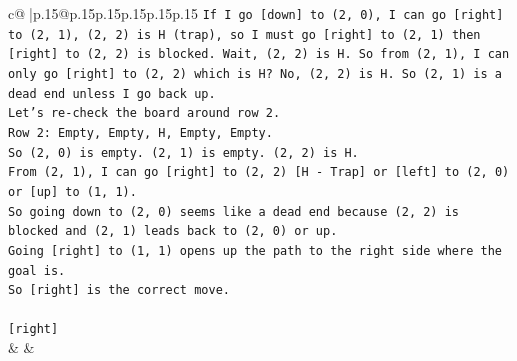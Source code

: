 \documentclass{article}
\begin{document}
{\begin{supertabular}{c@{$\;$}|p{.15\linewidth}@{}p{.15\linewidth}p{.15\linewidth}p{.15\linewidth}p{.15\linewidth}p{.15\linewidth}}
{{{\texttt{If I go {[}down{]} to (2, 0), I can go {[}right{]} to (2, 1), (2, 2) is H (trap), so I must go {[}right{]} to (2, 1) then {[}right{]} to (2, 2) is blocked. Wait, (2, 2) is H. So from (2, 1), I can only go {[}right{]} to (2, 2) which is H? No, (2, 2) is H. So (2, 1) is a dead end unless I go back up.} \\
\texttt{Let's re{-}check the board around row 2.} \\
\texttt{Row 2: Empty, Empty, H, Empty, Empty.} \\
\texttt{So (2, 0) is empty. (2, 1) is empty. (2, 2) is H.} \\
\texttt{From (2, 1), I can go {[}right{]} to (2, 2) {[}H {-} Trap{]} or {[}left{]} to (2, 0) or {[}up{]} to (1, 1).} \\
\texttt{So going down to (2, 0) seems like a dead end because (2, 2) is blocked and (2, 1) leads back to (2, 0) or up.} \\
\texttt{Going {[}right{]} to (1, 1) opens up the path to the right side where the goal is.} \\
\texttt{So {[}right{]} is the correct move.} \\
\\ 
\texttt{{[}right{]}} \\
            }
        }
    }
    & & \\ \\


\end{supertabular}}
\end{document}
